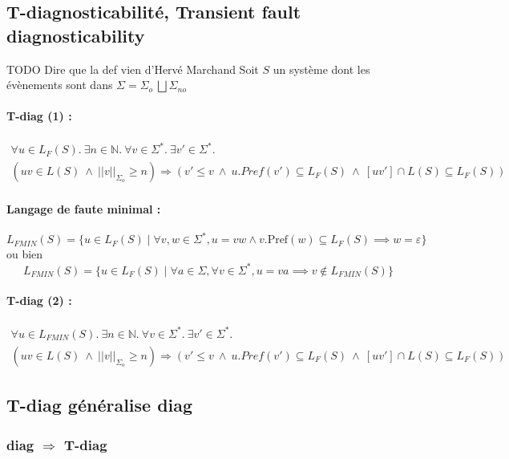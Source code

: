 \documentclass[conference]{IEEEtran}
\begin{document}
\subsection{T-diagnosticabilit\'e, Transient fault diagnosticability}
TODO Dire que la def vien d'Hervé Marchand
Soit $S$ un système dont les évènements sont dans $\Sigma = \Sigma_o \ \bigsqcup \Sigma_{no}$
\paragraph{T-diag (1) :}

\begin{multline*}
\forall u \in L_F(S).\ \exists n \in \mathbb{N}.\ \forall v \in \Sigma^*.\ \exists v' \in \Sigma^*. \\
(uv \in L(S) \ \wedge \  ||v||_{\Sigma_o}\geq n) \Rightarrow (v'\leq v \ \wedge \  u.Pref(v') \subseteq L_F(S) \ \wedge \  [uv'] \cap L(S) \subseteq L_F(S))
\end{multline*}


\paragraph{Langage de faute minimal :}
$$L_{FMIN}(S) = \{u \in L_F(S) \mid \forall v,w \in \Sigma^*, u = vw \land v.\text{Pref}(w)\subseteq L_F(S) \implies w = \varepsilon \}$$
ou bien
$$L_{FMIN}(S) = \{u \in L_F(S) \mid \forall a \in \Sigma, \forall v \in \Sigma^*, u = va \implies v \not \in L_{FMIN}(S)\}$$
\paragraph{T-diag (2) :}
\begin{multline*}
\forall u \in L_{FMIN}(S).\ \exists n \in \mathbb{N}.\ \forall v \in \Sigma^*.\ \exists v' \in \Sigma^*. \\
(uv \in L(S) \ \wedge \  ||v||_{\Sigma_o}\geq n) \Rightarrow (v'\leq v \ \wedge \  u.Pref(v') \subseteq L_F(S) \ \wedge \  [uv'] \cap L(S) \subseteq L_F(S))
\end{multline*}


\subsection{T-diag généralise diag}

\subsubsection{diag $\Rightarrow$ T-diag}
\end{document}
